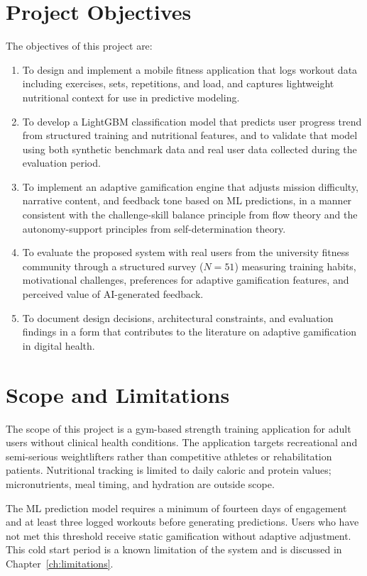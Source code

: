 \documentclass[12pt, a4paper]{report}
\begin{document}
\section{Project Objectives}

The objectives of this project are:

\begin{enumerate}
  \item To design and implement a mobile fitness application that logs workout data including exercises, sets, repetitions, and load, and captures lightweight nutritional context for use in predictive modeling.
  \item To develop a LightGBM classification model that predicts user progress trend from structured training and nutritional features, and to validate that model using both synthetic benchmark data and real user data collected during the evaluation period.
  \item To implement an adaptive gamification engine that adjusts mission difficulty, narrative content, and feedback tone based on ML predictions, in a manner consistent with the challenge-skill balance principle from flow theory and the autonomy-support principles from self-determination theory.
  \item To evaluate the proposed system with real users from the university fitness community through a structured survey (\(N = 51\)) measuring training habits, motivational challenges, preferences for adaptive gamification features, and perceived value of AI-generated feedback.
  \item To document design decisions, architectural constraints, and evaluation findings in a form that contributes to the literature on adaptive gamification in digital health.
\end{enumerate}

\section{Scope and Limitations}

The scope of this project is a gym-based strength training application for adult users without clinical health conditions. The application targets recreational and semi-serious weightlifters rather than competitive athletes or rehabilitation patients. Nutritional tracking is limited to daily caloric and protein values; micronutrients, meal timing, and hydration are outside scope.

The ML prediction model requires a minimum of fourteen days of engagement and at least three logged workouts before generating predictions. Users who have not met this threshold receive static gamification without adaptive adjustment. This cold start period is a known limitation of the system and is discussed in Chapter~\ref{ch:limitations}.
\end{document}
